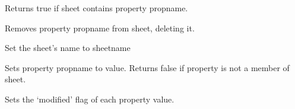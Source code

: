 \label{wxpropertysheethasproperty}


Returns true if sheet contains property propname.

\label{wxpropertysheetremoveproperty}


Removes property propname from sheet, deleting it.

\label{wxpropertysheetsetname}


Set the sheet's name to sheetname

\label{wxpropertysheetsetproperty}


Sets property propname to value. Returns false if property is not a member of sheet.



Sets the `modified' flag of each property value.

